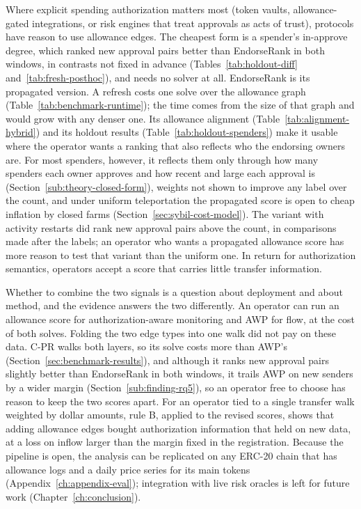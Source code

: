 
Where explicit spending authorization matters most (token vaults, allowance-gated integrations, or risk engines that treat approvals as acts of trust), protocols have reason to use allowance edges. The cheapest form is a spender's in-approve degree, which ranked new approval pairs better than EndorseRank in both windows, in contrasts not fixed in advance (Tables~\ref{tab:holdout-diff} and~\ref{tab:fresh-posthoc}), and needs no solver at all. EndorseRank is its propagated version. A refresh costs one solve over the allowance graph (Table~\ref{tab:benchmark-runtime}); the time comes from the size of that graph and would grow with any denser one. Its allowance alignment (Table~\ref{tab:alignment-hybrid}) and its holdout results (Table~\ref{tab:holdout-spenders}) make it usable where the operator wants a ranking that also reflects who the endorsing owners are. For most spenders, however, it reflects them only through how many spenders each owner approves and how recent and large each approval is (Section~\ref{sub:theory-closed-form}), weights not shown to improve any label over the count, and under uniform teleportation the propagated score is open to cheap inflation by closed farms (Section~\ref{sec:sybil-cost-model}). The variant with activity restarts did rank new approval pairs above the count, in comparisons made after the labels; an operator who wants a propagated allowance score has more reason to test that variant than the uniform one. In return for authorization semantics, operators accept a score that carries little transfer information.


Whether to combine the two signals is a question about deployment and about method, and the evidence answers the two differently. An operator can run an allowance score for authorization-aware monitoring and AWP for flow, at the cost of both solves. Folding the two edge types into one walk did not pay on these data. C-PR walks both layers, so its solve costs more than AWP's (Section~\ref{sec:benchmark-results}), and although it ranks new approval pairs slightly better than EndorseRank in both windows, it trails AWP on new senders by a wider margin (Section~\ref{sub:finding-rq5}), so an operator free to choose has reason to keep the two scores apart. For an operator tied to a single transfer walk weighted by dollar amounts, rule B, applied to the revised scores, shows that adding allowance edges bought authorization information that held on new data, at a loss on inflow larger than the margin fixed in the registration. Because the pipeline is open, the analysis can be replicated on any ERC-20 chain that has allowance logs and a daily price series for its main tokens (Appendix~\ref{ch:appendix-eval}); integration with live risk oracles is left for future work (Chapter~\ref{ch:conclusion}).

